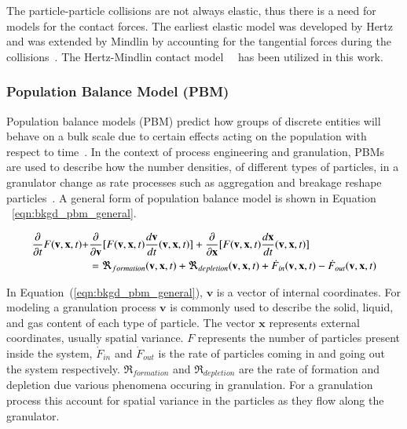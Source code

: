 \documentclass[preprint,11pt,authoryear]{elsarticle}
\begin{document}
The particle-particle collisions are not always elastic, thus there is a need
for models for the contact forces. The earliest elastic model was developed by
Hertz and was extended by Mindlin by accounting for the  tangential forces
during the collisions~\citep{adams2000}. The Hertz-Mindlin contact
model~\citep{gantt2006}~\citep{hassanpour2013} has been utilized in this work.
 

\subsubsection{Population Balance Model (PBM)}
Population balance models (PBM) predict how groups of discrete entities will 
behave on a bulk scale due to certain effects acting on the population with 
respect to time~\citep{ramkrishna2014}. In the context of process engineering 
and granulation, PBMs are used to describe how the number 
densities, of different types of particles, in a granulator change as rate 
processes such as aggregation and breakage reshape particles~\citep{Barrasso2013}. A 
general form of population balance model is shown in Equation
~\ref{eqn:bkgd_pbm_general}.
  
\begin{align}
\frac{ \partial}{\partial t}F(\textbf{v},\textbf{x},t) +& \frac{\partial}{\partial 
\textbf{v}}[F(\textbf{v},\textbf{x},t)\frac{d\textbf{v}}{dt}(\textbf{v},\textbf{x},t)] 
+ \frac{\partial}{\partial \textbf{x}}[F(\textbf{v},\textbf{x},t)\frac{d\textbf{x}}{dt}
(\textbf{v},\textbf{x},t)] \notag\\
    &= 
\Re_{formation}(\textbf{v},\textbf{x},t)+\Re_{depletion}(\textbf{v},\textbf{x},t)
+\dot{F}_{in}(\textbf{v},\textbf{x},t)-\dot{F}_{out}(\textbf{v},\textbf{x},t)
\label{eqn:bkgd_pbm_general} 
\end{align}
    
In Equation~(\ref{eqn:bkgd_pbm_general}), $\textbf{v}$ is a vector of internal 
coordinates. For modeling a granulation process $\textbf{v}$ is commonly used 
to describe the solid, liquid, and gas content of each type of particle. The 
vector $\textbf{x}$ represents external coordinates, usually spatial variance. 
\textbf{$F$} represents the number of particles present inside the system, 
\textbf{$\dot{F}_{in}$} and \textbf{$\dot{F}_{out}$} is the rate of particles 
coming in and going out the system respectively. $\Re_{formation}$ and $\Re_{depletion}$ 
are the rate of formation and depletion due various phenomena occuring in granulation. 
For a granulation process this account for spatial variance in the particles as 
they flow along the granulator.
\end{document}
